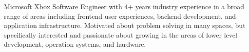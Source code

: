 

\begin{cvparagraph}

Microsoft Xbox Software Engineer with 4+ years industry experience in a broad range of areas including frontend user experiences, backend development, and application infrastructure. Motivated about problem solving in many spaces, but specifically interested and passionate about growing in the areas of lower level development, operation systems, and hardware.
\end{cvparagraph}
